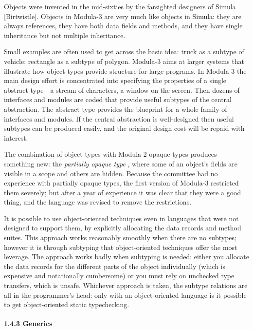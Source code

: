 \documentclass[10pt]{article}
\begin{document}
  Objects were invented in the mid-sixties by the farsighted designers of Simula [Birtwistle]. Objects in Modula-3 are very much like objects in Simula: they are always references, they have both data fields and methods, and they have single inheritance but not multiple inheritance. 


  Small examples are often used to get across the basic idea: truck as a subtype of vehicle; rectangle as a subtype of polygon. Modula-3 aims at larger systems that illustrate how object types provide structure for large programs. In Modula-3 the main design effort is concentrated into specifying the properties of a single abstract type---a stream of characters, a window on the screen. Then dozens of interfaces and modules are coded that provide useful subtypes of the central abstraction. The abstract type provides the blueprint for a whole family of interfaces and modules. If the central abstraction is well-designed then useful subtypes can be produced easily, and the original design cost will be repaid with interest. 


 The combination of object types with Modula-2 opaque types produces something new: the \emph{partially opaque type}
, where some of an object's fields are visible in a scope and others are hidden. Because the committee had no experience with partially opaque types, the first version of Modula-3 restricted them severely; but after a year of experience it was clear that they were a good thing, and the language was revised to remove the restrictions. 


  It is possible to use object-oriented techniques even in languages that were not designed to support them, by explicitly allocating the data records and method suites. This approach works reasonably smoothly when there are no subtypes; however it is through subtyping that object-oriented techniques offer the most leverage. The approach works badly when subtyping is needed: either you allocate the data records for the different parts of the object individually (which is expensive and notationally cumbersome) or you must rely on unchecked type transfers, which is unsafe. Whichever approach is taken, the subtype relations are all in the programmer's head: only with an object-oriented language is it possible to get object-oriented static typechecking. 


 
\paragraph{1.4.3 Generics}
\end{document}
